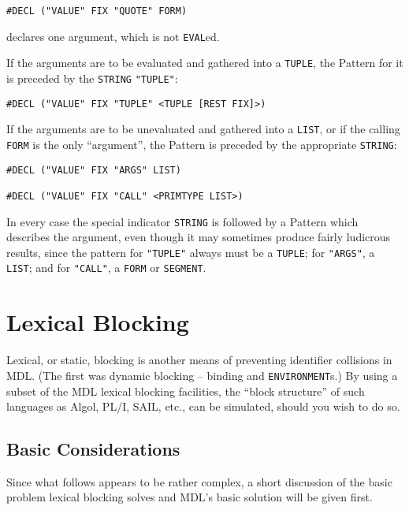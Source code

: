 \documentclass[a4paper]{scrbook}
\begin{document}
\begin{verbatim}
#DECL ("VALUE" FIX "QUOTE" FORM)
\end{verbatim}

declares one argument, which is not \texttt{EVAL}ed.

If the arguments are to be evaluated and gathered into a \texttt{TUPLE},  the Pattern for it is
preceded by the \texttt{STRING} \texttt{"TUPLE"}:

\begin{verbatim}
#DECL ("VALUE" FIX "TUPLE" <TUPLE [REST FIX]>)
\end{verbatim}

If the arguments are to be unevaluated and gathered into a \texttt{LIST}, or if the calling \texttt{FORM} is the only
``argument'', the Pattern is preceded by the appropriate \texttt{STRING}:

\begin{verbatim}
#DECL ("VALUE" FIX "ARGS" LIST)

#DECL ("VALUE" FIX "CALL" <PRIMTYPE LIST>)
\end{verbatim}

In every case the special indicator \texttt{STRING} is followed by a Pattern which describes the argument, even though it
may sometimes produce fairly ludicrous results, since the pattern for \texttt{"TUPLE"} always must be a \texttt{TUPLE}; for
\texttt{"ARGS"}, a \texttt{LIST}; and for \texttt{"CALL"}, a \texttt{FORM} or \texttt{SEGMENT}.

\chapter{Lexical Blocking}\label{chapter-15.-lexical-blocking}

Lexical, or static, blocking is another means of preventing identifier collisions in MDL. (The first was dynamic blocking
-- binding and \texttt{ENVIRONMENT}s.) By using a subset of the MDL lexical blocking facilities, the ``block structure'' of
such languages as Algol, PL/I, SAIL, etc., can be simulated, should you wish to do so.

\section{Basic Considerations}\label{basic-considerations}

Since what follows appears to be rather complex, a short discussion of the basic problem lexical blocking solves and MDL's
basic solution will be given first.
\end{document}

